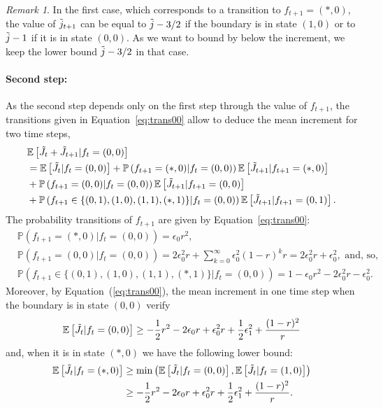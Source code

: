\documentclass[11pt]{article}
\theoremstyle{plain}
\theoremstyle{definition}
\theoremstyle{remark}
\newtheorem{remark}{Remark}
\newcommand{\prob}[1]{\mathbb{P}\left( #1 \right)}
\newcommand{\esp}[1]{\mathbb{E}\left[ #1 \right]}
\begin{document}
\begin{remark}
In the first case, which corresponds to a transition to $f_{t+1} = (*,0)$, the value of $\Tilde{j}_{t+1}$ can be equal to $\Tilde{j}-3/2$ if the boundary is in state $(1,0)$ or to $\Tilde{j}-1$ if it is in state $(0,0)$. As we want to bound by below the increment, we keep the lower bound $\Tilde{j} -3/2$ in that case.
\end{remark}

\paragraph{Second step:}
As the second step depends only on the first step through the value of $f_{t+1}$, the transitions given in Equation~\eqref{eq:trans00} allow to deduce the mean increment for two time steps,
\begin{align}
& \esp{\Tilde{J}_{t}+ \Tilde{J}_{t+1}|f_t=(0,0)} \nonumber \\
& =\esp{\Tilde{J}_t|f_t=(0,0)} + \prob{f_{t+1}= (*,0) | f_t=(0,0)} \esp{\Tilde{J}_{t+1}|f_{t+1}=  (*,0)} \nonumber \\
& + \prob{f_{t+1}=(0,0)|f_t=(0,0)} \esp{\Tilde{J}_{t+1}|f_{t+1}=(0,0)} \nonumber \\
& + \prob{f_{t+1}\in \{(0,1),(1,0),(1,1),(*,1)\} |f_t=(0,0)} \esp{\Tilde{J}_{t+1}|f_{t+1} = (0,1)}. \label{eq:2pas}
\end{align}
The probability transitions of $f_{t+1}$ are given by Equation~\eqref{eq:trans00}:
\begin{align*}
& \prob{f_{t+1} = (*,0) |f_t=(0,0)} = \epsilon_0r^2,\\
& \prob{f_{t+1} = (0,0) |f_t=(0,0)} = 2\epsilon_0^2r+ \sum_{k=0}^\infty \epsilon_0^2 (1-r)^k r = 2\epsilon_0^2r + \epsilon_0^2, \text{ and, so, } \\
& \prob{f_{t+1}\in \{(0,1),(1,0),(1,1),(*,1)\} |f_t=(0,0)} = 1 - \epsilon_0 r^2 - 2 \epsilon_0^2 r - \epsilon_0^2.
\end{align*}
Moreover, by Equation~(\ref{eq:trans00}), the mean increment in one time step when the boundary is in state $(0,0)$ verify
\begin{align}
\esp{\Tilde{J}_{t} | f_{t} = (0,0) } \geq -\frac{1}{2} r^2 - 2 \epsilon_0 r+ \epsilon_0^2 r + \frac{1}{2} \epsilon_1^2 + \frac{(1-r)^2}{r} \label{eq:inf00}
\end{align}
and, when it is in state $(*,0)$ we have the following lower bound:
\begin{align}
\esp{\Tilde{J}_t | f_t = (*,0) } &\geq \min \left(\esp{\Tilde{J}_t|f_t=(0,0)} ,\esp{\Tilde{J}_t|f_t = (1,0)}\right) \nonumber\\
&\geq -\frac{1}{2} r^2 - 2 \epsilon_0 r+ \epsilon_0^2 r + \frac{1}{2} \epsilon_1^2 + \frac{(1-r)^2}{r}. \label{eq:inf*0}
\end{align}
\end{document}
